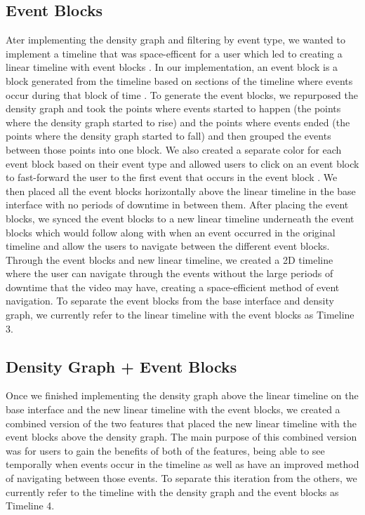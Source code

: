 \documentclass[doublespace,draft,nopageskip]{VTthesis} %
\begin{document}
\subsection{Event Blocks}
Ater implementing the density graph and filtering by event type, we wanted to implement a timeline that was space-efficent for a user which led to creating a linear timeline with event blocks \cite{lipkaScalableTimelineVisualization2016}. 
In our implementation, an event block is a block generated from the timeline based on sections of the timeline where events occur during that block of time \cite{hoeberBrowseLine2DTimeline2009, yanTwoDimensionalTimeline2004, brehmerTimelinesRevisitedDesign2017}. 
To generate the event blocks, we repurposed the density graph and took the points where events started to happen (the points where the density graph started to rise) and the points where events ended (the points where the density graph started to fall) and then grouped the events between those points into one block. 
We also created a separate color for each event block based on their event type and allowed users to click on an event block to fast-forward the user to the first event that occurs in the event block \cite{gordon5PrinciplesVisual}. 
We then placed all the event blocks horizontally above the linear timeline in the base interface with no periods of downtime in between them. After placing the event blocks, we synced the event blocks to a new linear timeline underneath the event blocks which would follow along with when an event occurred in the original timeline and allow the users to navigate between the different event blocks. 
Through the event blocks and new linear timeline, we created a 2D timeline where the user can navigate through the events without the large periods of downtime that the video may have, creating a space-efficient method of event navigation. 
To separate the event blocks from the base interface and density graph, we currently refer to the linear timeline with the event blocks as Timeline 3. 

\subsection{Density Graph + Event Blocks}
Once we finished implementing the density graph above the linear timeline on the base interface and the new linear timeline with the event blocks, we created a combined version of the two features that placed the new linear timeline with the event blocks above the density graph. The main purpose of this combined version was for users to gain the benefits of both of the features, being able to see temporally when events occur in the timeline as well as have an improved method of navigating between those events. To separate this iteration from the others, we currently refer to the timeline with the density graph and the event blocks as Timeline 4.
\end{document}
